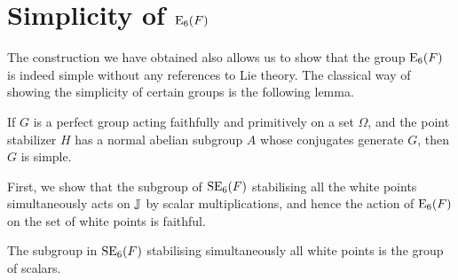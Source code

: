 \section{Simplicity of $\mathord{\mathrm{E}}_6(F)$}

The construction we have obtained also allows us to show that the group $\mathord{\mathrm{E}}_6(F)$ is indeed
simple without any references to Lie theory. The classical way of showing the simplicity of 
certain groups is the following lemma.

\begin{lemma}[Iwasawa]
    If $G$ is a perfect group acting faithfully and primitively 
    on a set $\Omega$, and the point stabilizer $H$ has a normal
    abelian subgroup $A$ whose conjugates generate $G$, then
    $G$ is simple.
\end{lemma}

First, we show that the subgroup of $\mathrm{SE}_6(F)$ stabilising 
all the white points simultaneously acts on $\mathbb{J}$ by scalar multiplications, and hence
the action of $\mathrm{E}_6(F)$ on the set of white points is faithful.

\begin{lemma}
	The subgroup in $\mathrm{SE}_6(F)$ stabilising simultaneously all white points
	is the group of scalars.  
\end{lemma}


